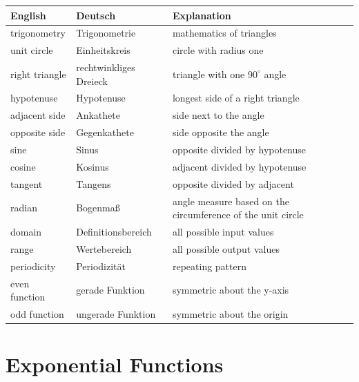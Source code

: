 \begin{tabular}{p{}p{}p{}}
\textbf{English} & \textbf{Deutsch} & \textbf{Explanation} \\ \hline
trigonometry & Trigonometrie & mathematics of triangles \\
unit circle & Einheitskreis & circle with radius one \\
right triangle & rechtwinkliges Dreieck & triangle with one $90^\circ$ angle \\
hypotenuse & Hypotenuse & longest side of a right triangle \\
adjacent side & Ankathete & side next to the angle \\
opposite side & Gegenkathete & side opposite the angle \\
sine & Sinus & opposite divided by hypotenuse \\
cosine & Kosinus & adjacent divided by hypotenuse \\
tangent & Tangens & opposite divided by adjacent \\
radian & Bogenmaß & angle measure based on the circumference of the unit circle \\
domain & Definitionsbereich & all possible input values \\
range & Wertebereich & all possible output values \\
periodicity & Periodizität & repeating pattern \\
even function & gerade Funktion & symmetric about the y-axis \\
odd function & ungerade Funktion & symmetric about the origin \\
\end{tabular}

\vspace{0.7cm}

\section*{Exponential Functions}

